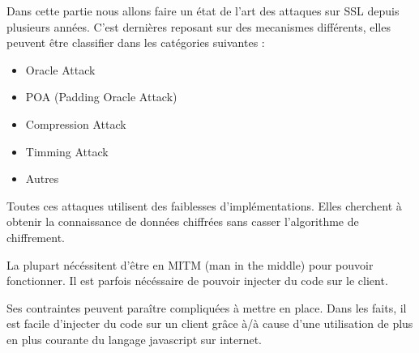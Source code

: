 Dans cette partie nous allons faire un état de l'art des attaques sur SSL depuis plusieurs années.
C'est dernières reposant sur des mecanismes différents, elles peuvent être classifier dans les catégories suivantes :

\begin{itemize}
\item Oracle Attack
\item POA (Padding Oracle Attack)
\item Compression Attack
\item Timming Attack
\item Autres
\end{itemize}

Toutes ces attaques utilisent des faiblesses d'implémentations.
Elles cherchent à obtenir la connaissance de données chiffrées
sans casser l'algorithme de chiffrement. 

La plupart nécéssitent d'être en MITM (man in the middle) pour pouvoir
fonctionner. Il est parfois nécéssaire de pouvoir injecter du code 
sur le client.

Ses contraintes peuvent paraître compliquées à mettre en place.
Dans les faits, il est facile d'injecter du code sur un client
grâce à/à cause d'une utilisation de plus en plus courante du langage
javascript sur internet.
